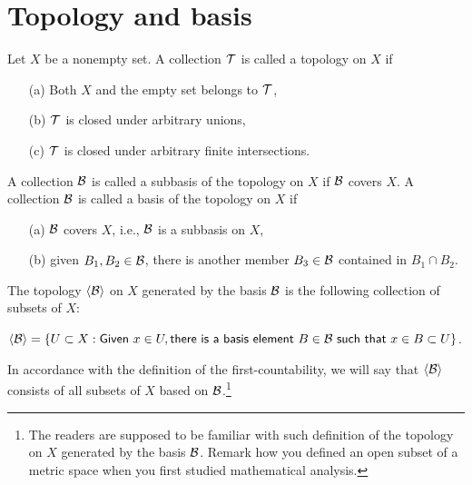 \section{Topology and basis}

\begin{defi}
    Let $X$ be a nonempty set.
    A collection ${\mathcal{T}}$ is called a topology on $X$ if
    \begin{enumerate}
        \item[(a)] Both $X$ and the empty set belongs to ${\mathcal{T}}$,
        \item[(b)] ${\mathcal{T}}$ is closed under arbitrary unions,
        \item[(c)] ${\mathcal{T}}$ is closed under arbitrary finite intersections.
    \end{enumerate}
\end{defi}

\begin{defi}
    A collection ${\mathcal{B}}$ is called a subbasis of the topology on $X$ if ${\mathcal{B}}$ covers $X$.
    A collection ${\mathcal{B}}$ is called a basis of the topology on $X$ if
    \begin{enumerate}
        \item[(a)] ${\mathcal{B}}$ covers $X$, i.e., ${\mathcal{B}}$ is a subbasis on $X$,
        \item[(b)] given $B_1, B_2\in{\mathcal{B}}$, there is another member $B_3\in{\mathcal{B}}$ contained in $B_1\cap B_2$.
    \end{enumerate}
    The topology $\langle{\mathcal{B}}\rangle$ on $X$ generated by the basis ${\mathcal{B}}$ is the following collection of subsets of $X$:
    \begin{center}
        ${\left\langle{{\mathcal{B}}}\right\rangle}=\left\{U\subset X:\textsf{Given }x\in U, \textsf{there is a basis element }B\in{\mathcal{B}}\textsf{ such that }x\in B\subset U\right\}$.
    \end{center}
    In accordance with the definition of the first-countability, we will say that ${\left\langle{{\mathcal{B}}}\right\rangle}$ consists of all subsets of $X$ based on ${\mathcal{B}}$.\footnote{The readers are supposed to be familiar with such definition of the topology on $X$ generated by the basis ${\mathcal{B}}$. Remark how you defined an open subset of a metric space when you first studied mathematical analysis.}
\end{defi}

